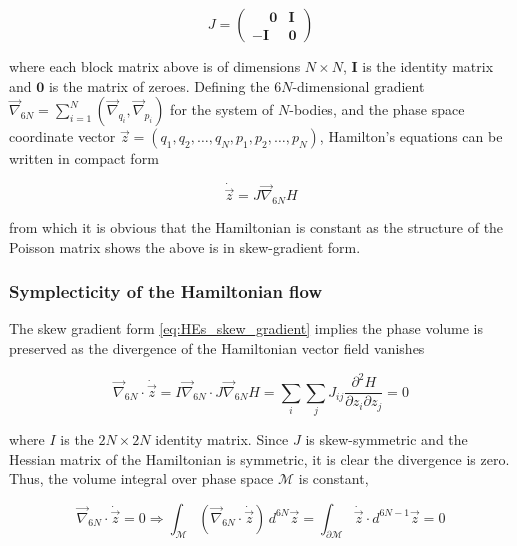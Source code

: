 \documentclass[11pt,titlepage]{report}
\begin{document}
\begin{equation}
J = \begin{pmatrix}
       \phantom{-}\boldsymbol{0} & \boldsymbol{I}     \\[0.3em]
         -\boldsymbol{I}   &  \boldsymbol{0}
     \end{pmatrix}\nonumber \end{equation}

\noindent where each block matrix above is of dimensions $N\times N$, $\boldsymbol{I}$ is the identity matrix and $\boldsymbol{0}$ is the matrix of zeroes. Defining the $6N$-dimensional gradient $\vec{\nabla}_{6N} = \sum_{i = 1}^N (\vec{\nabla}_{q_i},\vec{\nabla}_{p_i})$ for the system of $N$-bodies, and the phase space coordinate vector $\vec{z} = (q_1,q_2,\ldots , q_N,p_1,p_2,\ldots , p_N)$, Hamilton's equations can be written in compact form

\begin{equation}\dot{\vec{z}} = J\vec{\nabla}_{6N}H\label{eq:HEs_skew_gradient}\end{equation}

\noindent from which it is obvious that the Hamiltonian is constant as the structure of the Poisson matrix shows the above is in skew-gradient form.

\subsubsection{Symplecticity of the Hamiltonian flow}

The skew gradient form \eqref{eq:HEs_skew_gradient} implies the phase volume is preserved as the divergence of the Hamiltonian vector field vanishes

$$\vec{\nabla}_{6N}\cdot \dot{\vec{z}} = I\vec{\nabla}_{6N}\cdot J\vec{\nabla}_{6N} H = \sum_i\sum_j J_{ij}\frac{\partial^2 H}{\partial z_i \partial z_j} = 0$$

\noindent where $I$ is the $2N \times 2N$ identity matrix. Since $J$ is skew-symmetric and the Hessian matrix of the Hamiltonian is symmetric, it is clear the divergence is zero. Thus, the volume integral over phase space $\mathcal{M}$ is constant,






$$\vec{\nabla}_{6N}\cdot \dot{\vec{z}} = 0 \Rightarrow \int_{\mathcal{M}} (\vec{\nabla}_{6N}\cdot \dot{\vec{z}})\, d^{6N}\vec{z} = \int_{\partial \mathcal{M}} \dot{\vec{z}}\cdot d^{6N-1}\vec{z} = 0$$
\end{document}
